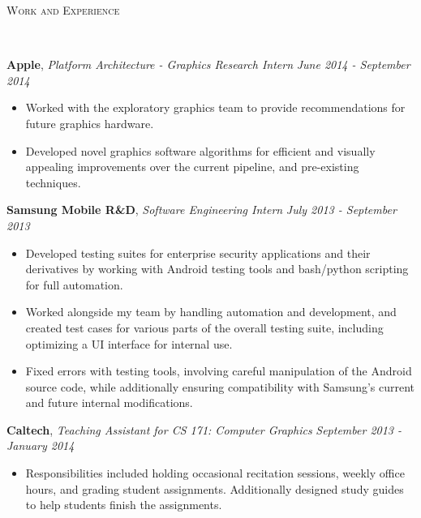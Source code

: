 \documentclass[9pt]{article}
\newenvironment{changemargin}[2]{%
  \begin{list}{}{%
    \setlength{\topsep}{0pt}%
    \setlength{\leftmargin}{#1}%
    \setlength{\rightmargin}{#2}%
    \setlength{\listparindent}{\parindent}%
    \setlength{\itemindent}{\parindent}%
    \setlength{\parsep}{\parskip}%
  }%
  \item[]}{\end{list}
}
\newcommand{\lineover}{
	\begin{changemargin}{-0.05in}{-0.05in}
		\vspace*{-8pt}
		\hrulefill \\
		\vspace*{-2pt}
	\end{changemargin}
}
\newcommand{\header}[1]{
	\begin{changemargin}{-0.5in}{-0.5in}
		\scshape{#1}\\
  	\lineover
	\end{changemargin}
}
\newenvironment{body} {
	\vspace*{-16pt}
	\begin{changemargin}{-0.25in}{-0.5in}
  }	
	{\end{changemargin}
}
\begin{document}
\header{Work and Experience}
\begin{body}
	\vspace{16pt}
	\textbf{Apple}, \emph{Platform Architecture - Graphics Research Intern} \hfill \emph{June 2014 - September 2014}\\
	\vspace*{-3pt}
	\begin{itemize} \itemsep -0pt %
	\item Worked with the exploratory graphics team to provide recommendations for future graphics hardware.
	\item Developed novel graphics software algorithms for efficient and visually appealing improvements over the current pipeline, and pre-existing techniques.
	\end{itemize}
	\vspace*{-3pt}
	\textbf{Samsung Mobile R\&D}, \emph{Software Engineering Intern} \hfill \emph{July 2013 - September 2013}\\
	\vspace*{-3pt}
	\begin{itemize} \itemsep -0pt %
	\item Developed testing suites for enterprise security applications and their derivatives by working with Android testing tools and bash/python scripting for full automation.
	\item Worked alongside my team by handling automation and development, and created test cases for various parts of the overall testing suite, including optimizing a UI interface for internal use.
	\item Fixed errors with testing tools, involving careful manipulation of the Android source code, while additionally ensuring compatibility with Samsung's current and future internal modifications.
	\end{itemize}
	\vspace*{-3pt}
	\textbf{Caltech}, \emph{Teaching Assistant for CS 171: Computer Graphics} \hfill \emph{September 2013 - January 2014}\\
	\vspace*{-3pt}
	\begin{itemize} \itemsep -0pt %
	\item Responsibilities included holding occasional recitation sessions, weekly office hours, and grading student assignments. Additionally designed study guides to help students finish the assignments.

\end{itemize}
\end{body}
\end{document}
